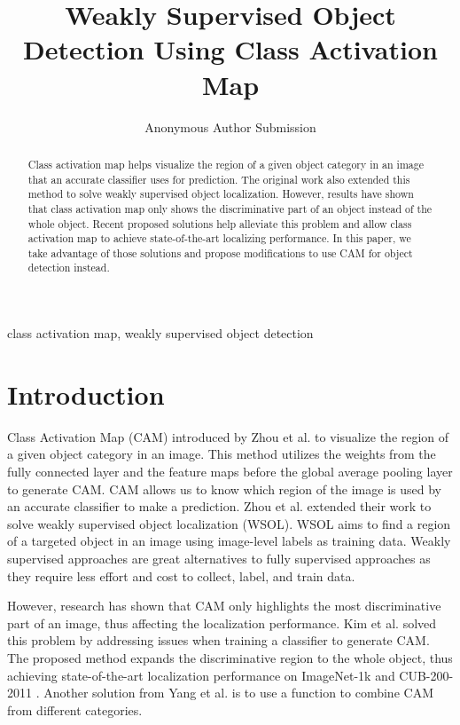 \documentclass[conference]{IEEEtran}
\begin{document}
\title{Weakly Supervised Object Detection Using Class Activation Map\\
}

\author{Anonymous Author Submission}

\maketitle

\begin{abstract}
    Class activation map helps visualize the region of a given object category in an image that an accurate classifier uses for prediction. The original work also extended this method to solve weakly supervised object localization. However, results have shown that class activation map only shows the discriminative part of an object instead of the whole object. Recent proposed solutions help alleviate this problem and allow class activation map to achieve state-of-the-art localizing performance. In this paper, we take advantage of those solutions and propose modifications to use CAM for object detection instead.
\end{abstract}

\begin{IEEEkeywords}
    class activation map, weakly supervised object detection
\end{IEEEkeywords}

\section{Introduction}
Class Activation Map (CAM) introduced by Zhou et al. \cite{zhou2015cnnlocalization} to visualize the region of a given object category in an image. This method utilizes the weights from the fully connected layer and the feature maps before the global average pooling layer to generate CAM. CAM allows us to know which region of the image is used by an accurate classifier to make a prediction. Zhou et al. extended their work to solve weakly supervised object localization (WSOL). WSOL aims to find a region of a targeted object in an image using image-level labels as training data. Weakly supervised approaches are great alternatives to fully supervised approaches \cite{Jocher_YOLO_by_Ultralytics_2023} \cite{ren2015faster} as they require less effort and cost to collect, label, and train data.

However, research has shown that CAM only highlights the most discriminative part of an image, thus affecting the localization performance. Kim et al. \cite{kim2022bridging} solved this problem by addressing issues when training a classifier to generate CAM. The proposed method expands the discriminative region to the whole object, thus achieving state-of-the-art localization performance on ImageNet-1k \cite{ILSVRC15} and CUB-200-2011 \cite{WahCUB_200_2011}. Another solution from Yang et al. \cite{yang2019combinational} is to use a function to combine CAM from different categories.
\end{document}
